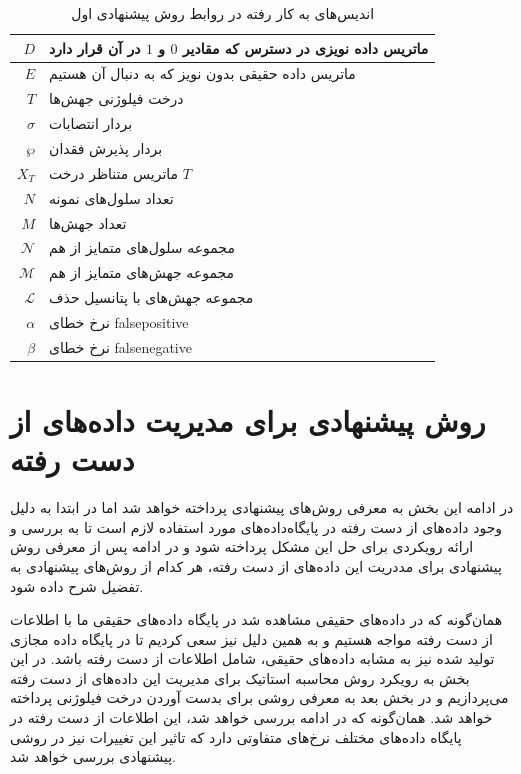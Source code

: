 	\begin{table}[ht]
	\caption{اندیس‌های به کار رفته در روابط روش پیشنهادی اول}
	\label{tab:ch_pm:firstpmIndices}
	\centering
	\onehalfspacing
	\begin{tabularx}{0.9\textwidth}{|r|X|}
		\hline
		$D$	& ماتریس داده نویزی در دسترس که مقادیر $0$ و $1$ در آن قرار دارد \\
		\hline
		$E$	& ماتریس داده حقیقی بدون نویز که به دنبال آن هستیم \\
		\hline
		$T$	& درخت فیلوژنی جهش‌ها \\
		\hline
		$\sigma$	 & بردار انتصابات \\
		\hline
		$\wp$ & بردار پذیرش فقدان$  $ \\
		\hline
		$X_T$	& ماتریس متناظر درخت $T$ \\
		\hline
		$N$	& تعداد سلول‌های نمونه \\
		\hline
		$M$	& تعداد جهش‌ها \\
		\hline
		$\mathcal{N}$ & مجموعه سلول‌های متمایز از هم \\
		\hline
		$\mathcal{M}$ & مجموعه جهش‌های متمایز از هم \\
		\hline
		$\mathcal{L}$ & مجموعه جهش‌های با پتانسیل حذف \\
		\hline
		$\alpha$	&  نرخ خطای \gls{falsepositive} \\
		\hline
		$\beta$	& نرخ خطای \gls{falsenegative} \\
		\hline
	\end{tabularx}
\end{table}



\section{روش پیشنهادی برای مدیریت داده‌های از دست رفته}

در ادامه این بخش به معرفی روش‌های پیشنهادی پرداخته خواهد شد اما در ابتدا به دلیل وجود داده‌های از دست رفته در پایگاه‌داده‌های مورد استفاده لازم است تا به بررسی و ارائه رویکردی برای حل این مشکل پرداخته شود و در ادامه پس از معرفی روش پیشنهادی برای مددریت این داده‌های از دست رفته، هر کدام از روش‌های پیشنهادی به تفضیل شرح داده شود.

همان‌گونه که در داده‌های حقیقی مشاهده شد در پایگاه داده‌های حقیقی ما با اطلاعات از دست رفته مواجه هستیم و به همین دلیل نیز سعی کردیم تا در پایگاه داده مجازی تولید شده نیز به مشابه داده‌های حقیقی، شامل اطلاعات از دست رفته باشد. در این بخش به رویکرد روش محاسبه استاتیک برای مدیریت این داده‌های از دست رفته می‌پردازیم و در بخش بعد به معرفی روشی برای بدست آوردن درخت فیلوژنی پرداخته خواهد شد. همان‌گونه که در ادامه بررسی خواهد شد، این اطلاعات از دست رفته در پایگاه داده‌های مختلف نرخ‌های متفاوتی دارد که تاثیر این تغییرات نیز در روشی پیشنهادی بررسی خواهد شد.

